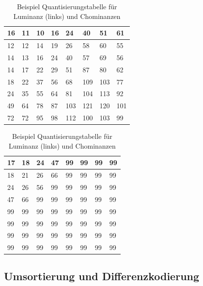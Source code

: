 \begin{table}
    \centering
    \begin{tabularx}{0.47\linewidth}{|X|X|X|X|X|X|X|X|}
        \hline
        16 & 11 & 10 & 16 & 24  & 40 & 51 & 61    \\ \hline
        12 & 12 & 14 & 19 & 26  & 58 & 60 & 55    \\ \hline
        14 & 13 & 16 & 24 & 40  & 57 & 69 & 56    \\ \hline
        14 & 17 & 22 & 29 & 51  & 87 & 80 & 62    \\ \hline
        18 & 22 & 37 & 56 & 68  & 109 & 103 & 77  \\ \hline
        24 & 35 & 55 & 64 & 81  & 104 & 113 & 92  \\ \hline
        49 & 64 & 78 & 87 & 103 & 121 & 120 & 101 \\ \hline
        72 & 72 & 95 & 98 & 112 & 100 & 103 & 99  \\ \hline        
    \end{tabularx}
    \qquad
    \begin{tabularx}{0.47\linewidth}{|X|X|X|X|X|X|X|X|}
        \hline
        17 & 18 & 24 & 47 & 99 & 99 & 99 & 99  \\ \hline
        18 & 21 & 26 & 66 & 99 & 99 & 99 & 99  \\ \hline
        24 & 26 & 56 & 99 & 99 & 99 & 99 & 99  \\ \hline
        47 & 66 & 99 & 99 & 99 & 99 & 99 & 99  \\ \hline
        99 & 99 & 99 & 99 & 99 & 99 & 99 & 99  \\ \hline
        99 & 99 & 99 & 99 & 99 & 99 & 99 & 99  \\ \hline
        99 & 99 & 99 & 99 & 99 & 99 & 99 & 99  \\ \hline
        99 & 99 & 99 & 99 & 99 & 99 & 99 & 99  \\ \hline  	  
    \end{tabularx}
    \caption{Beispiel Quantisierungstabelle für Luminanz (links) und Chominanzen
        \label{jpeg:tab:quant}}
\end{table}

\subsection{Umsortierung und Differenzkodierung
\label{jpeg:subsection:umsortierung}}